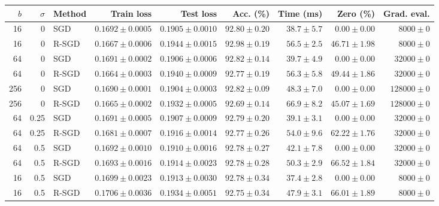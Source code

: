 \begin{tabular}{rrlrrrrrr}
\hline
$b$ & $\sigma$ & Method & Train loss & Test loss & Acc. (\%) & Time (ms) & Zero (\%) & Grad. eval. \\
\hline
16 & 0 & SGD & $0.1692 \pm 0.0005$ & $0.1905 \pm 0.0010$ & $92.80 \pm 0.20$ & $38.7 \pm 5.7$ & $0.00 \pm 0.00$ & $8000 \pm 0$ \\
16 & 0 & R-SGD & $0.1667 \pm 0.0006$ & $0.1944 \pm 0.0015$ & $92.98 \pm 0.19$ & $56.5 \pm 2.5$ & $46.71 \pm 1.98$ & $8000 \pm 0$ \\
64 & 0 & SGD & $0.1691 \pm 0.0002$ & $0.1906 \pm 0.0006$ & $92.82 \pm 0.14$ & $39.7 \pm 4.9$ & $0.00 \pm 0.00$ & $32000 \pm 0$ \\
64 & 0 & R-SGD & $0.1664 \pm 0.0003$ & $0.1940 \pm 0.0009$ & $92.77 \pm 0.19$ & $56.3 \pm 5.8$ & $49.44 \pm 1.86$ & $32000 \pm 0$ \\
256 & 0 & SGD & $0.1690 \pm 0.0001$ & $0.1904 \pm 0.0003$ & $92.82 \pm 0.09$ & $48.3 \pm 7.0$ & $0.00 \pm 0.00$ & $128000 \pm 0$ \\
256 & 0 & R-SGD & $0.1665 \pm 0.0002$ & $0.1932 \pm 0.0005$ & $92.69 \pm 0.14$ & $66.9 \pm 8.2$ & $45.07 \pm 1.69$ & $128000 \pm 0$ \\
64 & 0.25 & SGD & $0.1691 \pm 0.0005$ & $0.1907 \pm 0.0009$ & $92.79 \pm 0.20$ & $39.1 \pm 3.1$ & $0.00 \pm 0.00$ & $32000 \pm 0$ \\
64 & 0.25 & R-SGD & $0.1681 \pm 0.0007$ & $0.1916 \pm 0.0014$ & $92.77 \pm 0.26$ & $54.0 \pm 9.6$ & $62.22 \pm 1.76$ & $32000 \pm 0$ \\
64 & 0.5 & SGD & $0.1692 \pm 0.0010$ & $0.1910 \pm 0.0016$ & $92.78 \pm 0.27$ & $42.1 \pm 7.8$ & $0.00 \pm 0.00$ & $32000 \pm 0$ \\
64 & 0.5 & R-SGD & $0.1693 \pm 0.0016$ & $0.1914 \pm 0.0023$ & $92.78 \pm 0.28$ & $50.3 \pm 2.9$ & $66.52 \pm 1.84$ & $32000 \pm 0$ \\
16 & 0.5 & SGD & $0.1699 \pm 0.0023$ & $0.1913 \pm 0.0030$ & $92.78 \pm 0.34$ & $37.4 \pm 2.8$ & $0.00 \pm 0.00$ & $8000 \pm 0$ \\
16 & 0.5 & R-SGD & $0.1706 \pm 0.0036$ & $0.1934 \pm 0.0051$ & $92.75 \pm 0.34$ & $47.9 \pm 3.1$ & $66.01 \pm 1.89$ & $8000 \pm 0$ \\
\hline
\end{tabular}
